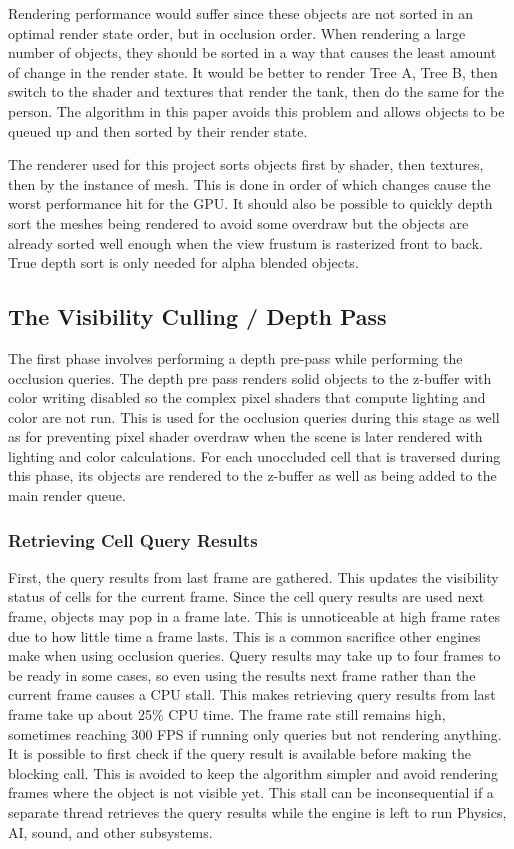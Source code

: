 \documentclass[12pt]{ucthesis}
\begin{document}
Rendering performance would suffer since these objects are not sorted in an optimal render state order, but in occlusion order.
When rendering a large number of objects, they should be sorted in a way that causes the least amount of change in the render state.
It would be better to render Tree A, Tree B, then switch to the shader and textures that render the tank, then do the same for the person.
The algorithm in this paper avoids this problem and allows objects to be queued up and then sorted by their render state.

The renderer used for this project sorts objects first by shader, then textures, then by the instance of mesh.
This is done in order of which changes cause the worst performance hit for the GPU.\cite{d3d10-sys}
It should also be possible to quickly depth sort the meshes being rendered to avoid some overdraw but the objects are already sorted well enough when the view frustum is rasterized front to back.
True depth sort is only needed for alpha blended objects.

\subsection{The Visibility Culling / Depth Pass}
\label{the-visibility-culling-depth-pass}

The first phase involves performing a depth pre-pass while performing the occlusion queries.
The depth pre pass renders solid objects to the z-buffer with color writing disabled so the complex pixel shaders that compute lighting and color are not run.
This is used for the occlusion queries during this stage as well as for preventing pixel shader overdraw when the scene is later rendered with lighting and color calculations.
For each unoccluded cell that is traversed during this phase, its objects are rendered to the z-buffer as well as being added to the main render queue.

\subsubsection{Retrieving Cell Query Results}
\label{retreiving-cell-query-results}

First, the query results from last frame are gathered.
This updates the visibility status of cells for the current frame.
Since the cell query results are used next frame, objects may pop in a frame late.
This is unnoticeable at high frame rates due to how little time a frame lasts.
This is a common sacrifice other engines make when using occlusion queries.
Query results may take up to four frames to be ready in some cases, so even using the results next frame rather than the current frame causes a CPU stall.
This makes retrieving query results from last frame take up about 25\% CPU time.
The frame rate still remains high, sometimes reaching 300 FPS if running only queries but not rendering anything.
It is possible to first check if the query result is available before making the blocking call.
This is avoided to keep the algorithm simpler and avoid rendering frames where the object is not visible yet.
This stall can be inconsequential if a separate thread retrieves the query results while the engine is left to run Physics, AI, sound, and other subsystems.
\end{document}
